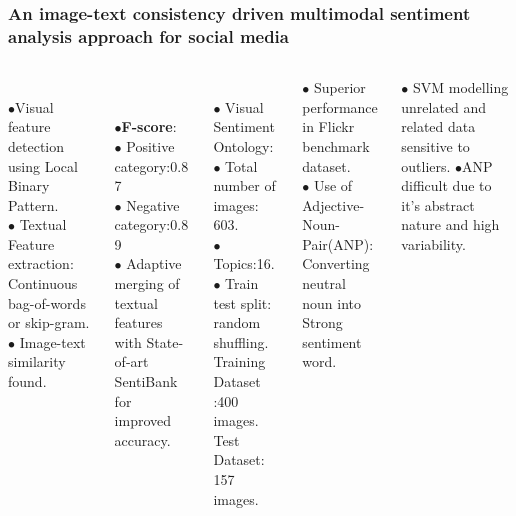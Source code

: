 \documentclass[]{beamer}
\begin{document}
\begin{frame}\frametitle{ An image-text consistency driven multimodal sentiment analysis approach for social media\cite{imageTextConsistency}}
\begin{columns}
	\begin{column}{0.20\textwidth}
		{}\\
		$\bullet$Visual feature detection using Local Binary Pattern.\\
		$\bullet$ Textual Feature extraction: Continuous bag-of-words or skip-gram. 
		$\bullet$ Image-text similarity found.\\
	\end{column}
	\begin{column}{0.23\textwidth}
		{}\\~\\
		$\bullet$\textbf{F-score}:\\
		$\bullet$ Positive category:0.87\\
		$\bullet$ Negative category:0.89\\
		$\bullet$ Adaptive merging of textual features with State-of-art SentiBank for improved accuracy.
	\end{column}
	\begin{column}{0.20\textwidth}
		{}
		\\$\bullet$ Visual Sentiment Ontology:\\
		$\bullet$ Total number of images: 603.\\
		$\bullet$ Topics:16.
		$\bullet$ Train test split: random shuffling. 
		Training Dataset :400 images.\\
		Test Dataset: 157 images.
	\end{column}
	\begin{column}{0.20\textwidth}
		{}
		\begin{center}
			$\bullet$ Superior performance in Flickr benchmark dataset.\\
			$\bullet$ Use of Adjective-Noun-Pair(ANP): Converting neutral noun into Strong sentiment word.
		\end{center}
	\end{column}
	\begin{column}{0.20\textwidth}
		{}
			$\bullet$ SVM modelling unrelated and related data sensitive to outliers.
			$\bullet$ANP difficult due to it's abstract nature and high variability.
	\end{column}	
\end{columns}
\end{frame}
\end{document}
